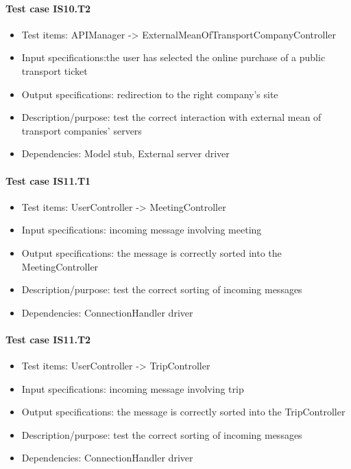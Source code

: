 \documentclass[a4paper,leqno]{article}
\begin{document}
\paragraph{Test case IS10.T2}
\begin{itemize}
	\item Test items: APIManager -> ExternalMeanOfTransportCompanyController
	\item Input specifications:the user has selected the online purchase of a public transport ticket
	\item Output specifications: redirection to the right company's site
	\item Description/purpose: test the correct interaction with external mean of transport companies' servers
	\item Dependencies: Model stub, External server driver
\end{itemize}

\paragraph{Test case IS11.T1}
\begin{itemize}
	\item Test items: UserController -> MeetingController
	\item Input specifications: incoming message involving meeting
	\item Output specifications: the message is correctly sorted into the MeetingController
	\item Description/purpose: test the correct sorting of incoming messages
	\item Dependencies: ConnectionHandler driver
\end{itemize}

\paragraph{Test case IS11.T2}
\begin{itemize}
	\item Test items: UserController -> TripController
	\item Input specifications: incoming message involving trip
	\item Output specifications: the message is correctly sorted into the TripController
	\item Description/purpose: test the correct sorting of incoming messages
	\item Dependencies: ConnectionHandler driver
\end{itemize}
\end{document}

